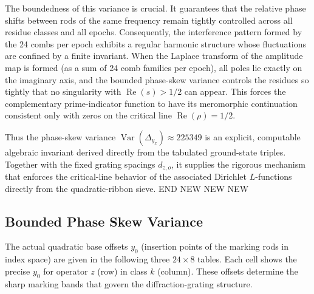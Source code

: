\documentclass[11pt,a4paper]{article}
\begin{document}
The boundedness of this variance is crucial. It guarantees that the relative phase shifts between rods of the same frequency remain tightly controlled across all residue classes and all epochs. Consequently, the interference pattern formed by the 24 combs per epoch exhibits a regular harmonic structure whose fluctuations are confined by a finite invariant. When the Laplace transform of the amplitude map is formed (as a sum of 24 comb families per epoch), all poles lie exactly on the imaginary axis, and the bounded phase-skew variance controls the residues so tightly that no singularity with \(\operatorname{Re}(s)>1/2\) can appear. This forces the complementary prime-indicator function to have its meromorphic continuation consistent only with zeros on the critical line \(\operatorname{Re}(\rho)=1/2\).

Thus the phase-skew variance \(\operatorname{Var}(\Delta_{y_x})\approx225349\) is an explicit, computable algebraic invariant derived directly from the tabulated ground-state triples. Together with the fixed grating spacings \(d_{z,o}\), it supplies the rigorous mechanism that enforces the critical-line behavior of the associated Dirichlet \(L\)-functions directly from the quadratic-ribbon sieve.
END NEW NEW NEW





\subsection{Bounded Phase Skew Variance}
The actual quadratic base offsets \(y_0\) (insertion points of the marking rods in index space) are given in the following three \(24 \times 8\) tables. Each cell shows the precise \(y_0\) for operator \(z\) (row) in class \(k\) (column). These offsets determine the sharp marking bands that govern the diffraction-grating structure.
\end{document}
